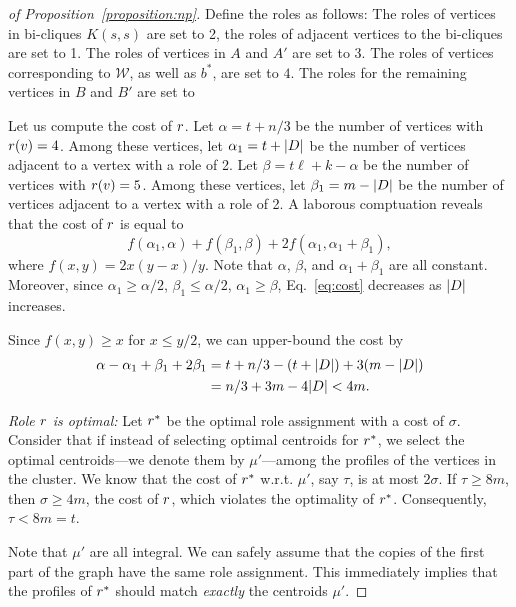 \begin{proof}[of Proposition~\ref{proposition:np}]
Define the roles as follows: The roles of vertices in bi-cliques $K(s, s)$ are
set to 2, the roles of adjacent vertices to the bi-cliques are set to 1. The
roles of vertices in $A$ and $A'$ are set to 3. The roles of vertices
corresponding to $\mathcal{W}$, as well as $b^*$, are set to $4$.
The roles for the remaining vertices in $B$ and $B'$ are set to 

Let us compute the cost of $r$.
Let $\alpha = t + n / 3$ be the number of vertices with $r(v) = 4$.
Among these vertices,
let $\alpha_1 = t + {\left|D\right|}$ be the number of vertices adjacent to a vertex with
a role of 2.
Let $\beta = t\ell + k - \alpha$ be the number of vertices with $r(v) = 5$.
Among these vertices,
let $\beta_1 = m - {\left|D\right|}$ be the number of vertices adjacent to a vertex with
a role of 2.
A laborous comptuation reveals that the cost of $r$ is equal to
\begin{equation}
\label{eq:cost}
	f(\alpha_1, \alpha) + f(\beta_1, \beta) + 2f(\alpha_1, \alpha_1 + \beta_1),
\end{equation}
where $f(x, y) = 2x(y - x)/y$. Note that $\alpha$, $\beta$, and $\alpha_1 + \beta_1$ are all constant.
Moreover, since
$\alpha_1 \geq \alpha / 2$,
$\beta_1 \leq \alpha / 2$,
$\alpha_1 \geq \beta$, Eq.~\ref{eq:cost} decreases as ${\left|D\right|}$ increases.


Since $f(x, y) \geq x$ for $x \leq y / 2$,
we can upper-bound the cost by
\[
\begin{split}
	\alpha - \alpha_1 + \beta_1 + 2\beta_1 & = t + n / 3 - (t + {\left|D\right|}) + 3(m - {\left|D\right|}) \\
	& = n / 3 + 3m - 4{\left|D\right|} < 4m.
\end{split}
\]

\fi

\emph{Role $r$ is optimal:}
Let $r^*$ be the optimal role assignment with a cost of $\sigma$.  Consider
that if instead of selecting optimal centroids for $r^*$, we select the
optimal centroids---we denote them by $\mu'$---among the profiles of the
vertices in the cluster. We know that the cost of $r^*$ w.r.t. $\mu'$, say
$\tau$, is at most $2\sigma$. If $\tau \geq 8m$, then $\sigma \geq 4m$, the cost of $r$, which
violates the optimality of $r^*$. Consequently, $\tau < 8m = t$.

Note that $\mu'$ are all integral. We can safely assume that the copies of the
first part of the graph have the same role assignment. This immediately implies
that the profiles of $r^*$ should match \emph{exactly} the centroids $\mu'$.


\end{proof}

